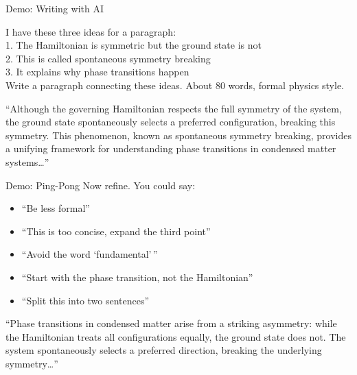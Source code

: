 \documentclass[aspectratio=169]{beamer}
\begin{document}
\begin{frame}{Demo: Writing with AI}
    \begin{userbox}
        \small
        I have these three ideas for a paragraph:\\
        1. The Hamiltonian is symmetric but the ground state is not\\
        2. This is called spontaneous symmetry breaking\\
        3. It explains why phase transitions happen\\[0.3em]
        Write a paragraph connecting these ideas. About 80 words, formal physics style.
    \end{userbox}

    \vspace{0.5em}
    \begin{assistantbox}
        \small
        ``Although the governing Hamiltonian respects the full symmetry of the system, the ground state spontaneously selects a preferred configuration, breaking this symmetry. This phenomenon, known as spontaneous symmetry breaking, provides a unifying framework for understanding phase transitions in condensed matter systems\ldots''
    \end{assistantbox}
\end{frame}

\begin{frame}{Demo: Ping-Pong}
    Now refine. You could say:
    \begin{itemize}
        \vspace{0.3em}
        \item ``Be less formal''
        \vspace{0.3em}
        \item ``This is too concise, expand the third point''
        \vspace{0.3em}
        \item ``Avoid the word `fundamental'\,''
        \vspace{0.3em}
        \item ``Start with the phase transition, not the Hamiltonian''
        \vspace{0.3em}
        \item ``Split this into two sentences''
    \end{itemize}

    \vspace{0.5em}
    \begin{assistantbox}
        \small
        ``Phase transitions in condensed matter arise from a striking asymmetry: while the Hamiltonian treats all configurations equally, the ground state does not. The system spontaneously selects a preferred direction, breaking the underlying symmetry\ldots''
    \end{assistantbox}
\end{frame}
\end{document}
